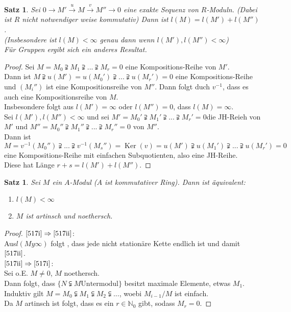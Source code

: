 \documentclass[10pt,a4paper]{article}
\newcommand{\N}{\ensuremath{\mathbb{N}}}
\newcommand{\Ker}{\ensuremath{\operatorname{Ker}}}
\newcounter{thm}[section]
\theoremstyle{definition}
\theoremstyle{plain}
\newtheorem{satz}[thm]{Satz}
\theoremstyle{remark}
\begin{document}
\begin{satz} %
	Sei $0\rightarrow M'\xrightarrow{u} M\xrightarrow{v} M''\rightarrow 0$ eine exakte Sequenz von $R$-Moduln. (Dabei ist $R$ nicht notwendiger weise kommutativ) Dann ist $l(M)=l(M')+l(M'')$.\\
	(Insbesondere ist $l(M)<\infty$ genau dann wenn $l(M'),l(M'')<\infty$)\\
	Für Gruppen ergibt sich ein anderes Resultat.
\end{satz}
\begin{proof}
	 Sei $M=M_0\supsetneqq M_1\supsetneqq...\supsetneqq M_r=0$ eine Kompositions-Reihe von $M'$.\\
	 Dann ist $M\supsetneqq u(M')=u(M_0')\supsetneqq...\supsetneqq u(M_r')=0$ eine Kompositions-Reihe und $(M_i'')$ ist eine Kompositionsreihe von $M''$. Dann folgt duch $v^{-1}$, dass es auch eine Kompositionsreihe von $M$.\\
	 Insbesondere folgt aus $l(M')=\infty $ oder $l(M'')=0$, dass $l(M)=\infty$.\\
	 Sei $l(M'),l(M'')<\infty$ und sei
	 $M'=M_0'\supsetneqq M_1'\supsetneqq...\supsetneqq M_r'=0$die JH-Reieh von $M'$ und $M''=M_0''\supsetneqq M_1''\supsetneqq...\supsetneqq M_r''=0$ von $M''$.\\
	 Dann ist
	 \[M=v^{-1}(M_0'')\supsetneqq ...\supsetneqq v^{-1}(M_s'')=\Ker(v)=u(M')\supsetneqq u(M_1')\supsetneqq...\supsetneqq u(M_r')=0\]
	 eine Kompositions-Reihe mit einfachen Subquotienten, also eine JH-Reihe.\\
	 Diese hat Länge $r+s=l(M')+l(M'')$.
\end{proof}
\begin{satz}\label{517Satz}
	Sei $M$ ein $A$-Modul ($A$ ist kommutativer Ring). Dann ist äquivalent:\begin{enumerate}
		\item $l(M)<\infty$ \label{517i}
		\item $M$ ist artinsch und noethersch.\label{517ii}
	\end{enumerate}
\end{satz}
\begin{proof}
	$\ref{517i}\Rightarrow\ref{517ii}$: \\
	Aus$l(My\infty)$ folgt , dass jede nicht stationäre Kette endlich ist und damit $\ref{517ii}$.\\
	$\ref{517ii}\Rightarrow\ref{517i}$: \\
	Sei o.E. $M\neq 0$, $M$ noethersch.\\
	Dann folgt, dass $\{N\subsetneqq M\text{Untermodul}\}$ besitzt maximale Elemente, etwas $M_1$.\\
	Induktiv gilt $M=M_0\subsetneqq M_1\subsetneqq M_2\subsetneqq ...$, woebi $M_{i-1}/M$ ist einfach.\\
	Da $M$ artinsch ist folgt, dass es ein $r\in\N_0$ gibt, sodass $M_r=0$.
\end{proof}
\end{document}
